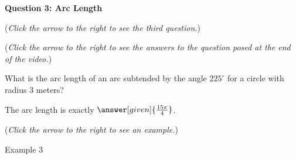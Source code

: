 \documentclass{ximera}
\begin{document}
\textbf{Question 3: Arc Length}
\begin{question}
\begin{flushright}
{\color{blue}(\emph{Click the arrow to the right to see the third question.})}
\end{flushright}
\begin{center}
\begin{expandable}
{\color{blue}(\emph{Click the arrow to the right to see the answers 
to the question posed at the end of the video.})}
\begin{expandable}
What is the arc length of an arc subtended by the angle $225^\circ$ for a circle with radius $3$ meters?\\
\begin{prompt}
The arc length is exactly $\answer[given]{\frac{15\pi}{4}}$.
\end{prompt}
\begin{flushright}
{\color{blue}(\emph{Click the arrow to the right to see an example.})}
\end{flushright}
\begin{expandable}
Example 3
\end{expandable}
\end{expandable}
\end{expandable}
\end{center}
\end{question}
\end{document}
